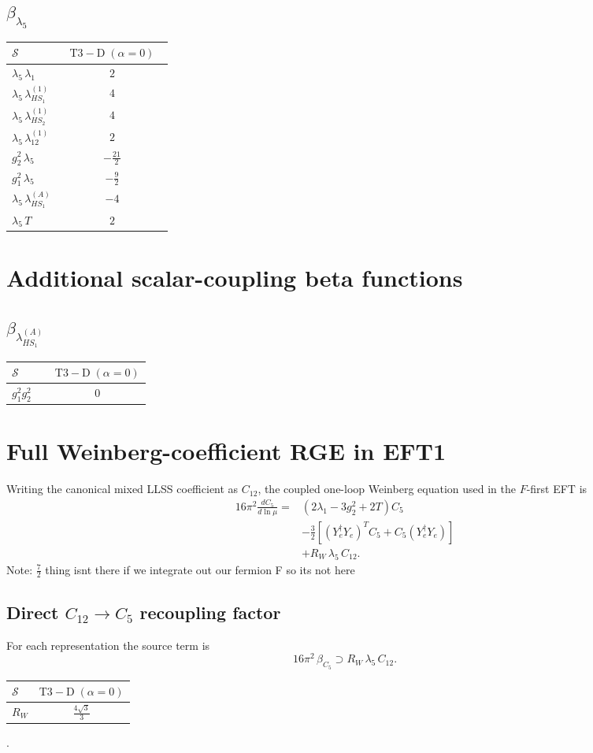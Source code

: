 \documentclass[9pt]{article}
\begin{document}
\subsection*{$ \beta_{\lambda_5} $}
\begin{longtable}{@{}p{0.31\linewidth}c@{}}
\toprule
$\mathcal{S}$ & $ \mathrm{T3-D}\;(\alpha=0) $ \\
\midrule
$ \lambda_5\,\lambda_1 $ & $ 2 $ \\
$ \lambda_5\,\lambda_{HS_1}^{(1)} $ & $ 4 $ \\
$ \lambda_5\,\lambda_{HS_2}^{(1)} $ & $ 4 $ \\
$ \lambda_5\,\lambda_{12}^{(1)} $ & $ 2 $ \\
$ g_2^2\,\lambda_5 $ & $ - \frac{21}{2} $ \\
$ g_1^2\,\lambda_5 $ & $ - \frac{9}{2} $ \\
$ \lambda_5\,\lambda_{HS_1}^{(A)} $ & $ -4 $ \\
$ \lambda_5\,T $ & $ 2 $ \\
\bottomrule
\end{longtable}
\section*{Additional scalar-coupling beta functions}
\subsection*{$ \beta_{\lambda_{HS_1}^{(A)}} $}
\begin{longtable}{@{}p{0.31\linewidth}c@{}}
\toprule
$\mathcal{S}$ & $ \mathrm{T3-D}\;(\alpha=0) $ \\
\midrule
$ g_1^2g_2^2 $ & $ 0 $ \\
\bottomrule
\end{longtable}

\section*{Full Weinberg-coefficient RGE in EFT1}
Writing the canonical mixed LLSS coefficient as $C_{12}$, the coupled one-loop Weinberg equation used in the $F$-first EFT is
\begin{align}
16\pi^2\frac{dC_5}{d\ln\mu}={}&(2\lambda_1-3g_2^2+2T)C_5\\
&-\frac32\left[(Y_e^\dagger Y_e)^T C_5+C_5(Y_e^\dagger Y_e)\right]\\
&+R_W\,\lambda_5\,C_{12}.
\end{align}
Note: $\frac{7}{2}$ thing isnt there if we integrate out our fermion F so its not here \subsection*{Direct $C_{12}\to C_5$ recoupling factor}
For each representation the source term is
\[16\pi^2\,\beta_{C_5}\supset R_W\,\lambda_5\,C_{12}.\]
\begin{longtable}{@{}lc@{}}
\toprule
$\mathcal{S}$ & $ \mathrm{T3-D}\;(\alpha=0) $ \\
\midrule
$R_W$ & $ \frac{4 \sqrt{3}}{3} $ \\
\bottomrule
\end{longtable}
.
\end{document}

